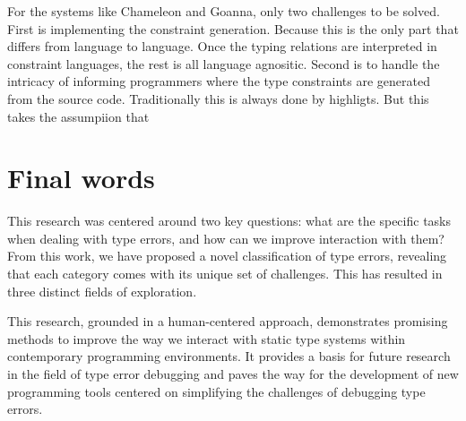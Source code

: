 For the systems like Chameleon and Goanna, only two challenges to be solved. First is implementing the constraint generation. Because this is the only part that differs from language to language. Once the typing relations are interpreted in constraint languages, the rest is all language agnositic.  Second is to handle the intricacy of informing programmers where the type constraints are generated from the source code. Traditionally this is always done by highligts. But this takes the assumpiion that 


\section{Final words}

This research was centered around two key questions: what are the specific tasks when dealing with type errors, and how can we improve interaction with them? From this work, we have proposed a novel classification of type errors, revealing that each category comes with its unique set of challenges. This has resulted in three distinct fields of exploration. 

This research, grounded in a human-centered approach, demonstrates promising methods to improve the way we interact with static type systems within contemporary programming environments. It provides a basis for future research in the field of type error debugging and paves the way for the development of new programming tools centered on simplifying the challenges of debugging type errors. 
